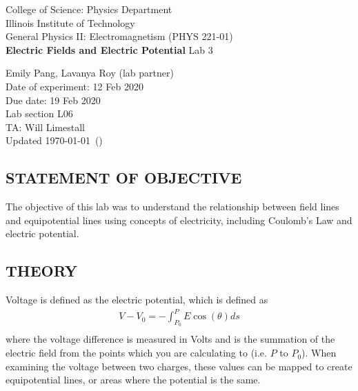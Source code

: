 \documentclass [12pt, letterpaper, twoside] {article}
\begin{document}
\begin {titlepage}
\begin {center}
College of Science: Physics Department \\
\vspace {0.1cm}
Illinois Institute of Technology\\
\vspace {0.1cm}
General Physics II: Electromagnetism (PHYS 221-01)\\
\vspace* {\fill}
\begingroup
\Large
\textbf {Electric Fields and Electric Potential}
\vspace {0.35cm}
\normalsize
Lab 3
\vspace {1.5cm}
\endgroup
\vspace* {\fill}
\end {center}

\vspace*{\fill}
\begin {flushright}
\footnotesize
Emily Pang, Lavanya Roy (lab partner) \\
Date of experiment: 12 Feb 2020 \\
Due date: 19 Feb 2020 \\
Lab section L06 \\
TA: Will Limestall \\
Updated \usdate\today~(\currenttime)
\end {flushright}
\end {titlepage}
\subsection* {STATEMENT OF OBJECTIVE}
The objective of this lab was to understand the relationship between field lines and equipotential lines using concepts of electricity, including Coulomb's Law and electric potential.

\subsection* {THEORY}
Voltage is defined as the electric potential, which is defined as
\begin{equation}
  \begin{split}
    V - V_{0} = -\int_{P_{0}}^{P}E\cos(\theta)ds \\
  \end{split}
\end{equation}
where the voltage difference is measured in Volts and is the summation of the electric field from the points which you are calculating to (i.e. \(P\) to \(P_{0}\)).\cite{labManual} When examining the voltage between two charges, these values can be mapped to create equipotential lines, or areas where the potential is the same. 
\end{document}
